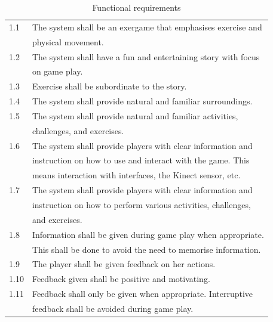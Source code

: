 \begin{table} [H]

\centering
\begin{tabular}{|l|l|}
\hline
1.1 & The system shall be an exergame that emphasises exercise and \\ & physical movement.  \\ \hline
1.2 & The system shall have a fun and entertaining story with focus \\ & on game play.  \\ \hline
1.3 & Exercise shall be subordinate to the story. \\ \hline
1.4 & The system shall provide natural and familiar surroundings. \\ \hline
1.5 & The system shall provide natural and familiar activities, \\ & challenges, and exercises.\\ \hline
1.6 & The system shall provide players with clear information and \\ & instruction on how to use and interact with the game. This \\ & means interaction with interfaces, the Kinect sensor, etc. \\ \hline
1.7 & The system shall provide players with clear information and \\ & instruction on how to perform various activities, challenges,\\ & and exercises. \\ \hline
1.8 & Information shall be given during game play when appropriate. \\ & This shall be done to avoid the need to memorise information. \\ \hline
1.9 & The player shall be given feedback on her actions.\\ \hline
1.10 & Feedback given shall be positive and motivating.\\ \hline
1.11 & Feedback shall only be given when appropriate. Interruptive \\ & feedback shall be avoided during game play. \\ \hline
    \end{tabular}
    \caption[Functional requirements]{Functional requirements}
    \label{tab:func1}
\end{table} 

